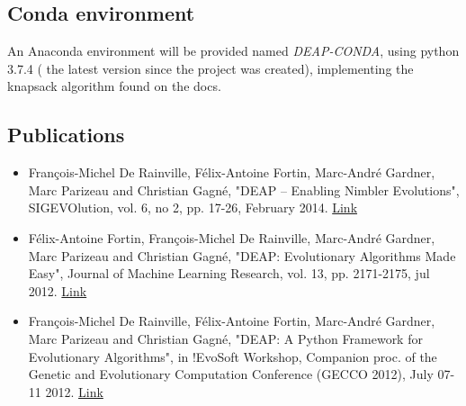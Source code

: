 \documentclass{article}
\begin{document}
	\subsection{Conda environment}
	An Anaconda environment will be provided named \textit{DEAP-CONDA}, using python 3.7.4 ( the latest version since the project was created), implementing the knapsack algorithm found on the docs.
	\subsection{Publications}
	\begin{itemize}
		\item 
		François-Michel De Rainville, Félix-Antoine Fortin, Marc-André Gardner, Marc Parizeau and Christian Gagné, "DEAP -- Enabling Nimbler Evolutions", SIGEVOlution, vol. 6, no 2, pp. 17-26, February 2014. \href{http://vision.gel.ulaval.ca/~cgagne/pubs/sigevolution2014.pdf}{Link}
		\item  Félix-Antoine Fortin, François-Michel De Rainville, Marc-André Gardner, Marc Parizeau and Christian Gagné, "DEAP: Evolutionary Algorithms Made Easy", Journal of Machine Learning Research, vol. 13, pp. 2171-2175, jul 2012. \href{http://jmlr.csail.mit.edu/papers/v13/fortin12a.html}{Link}
		\item  François-Michel De Rainville, Félix-Antoine Fortin, Marc-André Gardner, Marc Parizeau and Christian Gagné, "DEAP: A Python Framework for Evolutionary Algorithms", in !EvoSoft Workshop, Companion proc. of the Genetic and Evolutionary Computation Conference (GECCO 2012), July 07-11 2012. \href{http://vision.gel.ulaval.ca/~cgagne/pubs/deap-gecco-2012.pdf}{Link}
		
	\end{itemize}
\end{document}
